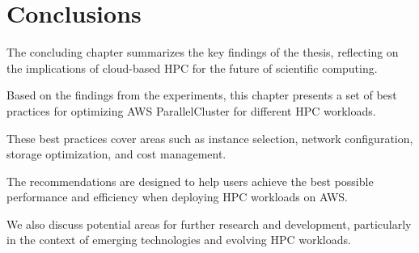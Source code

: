 

\chapter{Conclusions}

The concluding chapter summarizes the key findings of the thesis, reflecting on the implications of cloud-based HPC for the future of scientific computing. 

Based on the findings from the experiments, this chapter presents a set of best practices for optimizing AWS ParallelCluster for different HPC workloads. 

These best practices cover areas such as instance selection, network configuration, storage optimization, and cost management. 

The recommendations are designed to help users achieve the best possible performance and efficiency when deploying HPC workloads on AWS.

We also discuss potential areas for further research and development, particularly in the context of emerging technologies and evolving HPC workloads.

